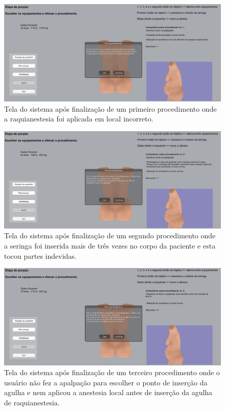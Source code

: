 \begin{figure}[ht!]
    \centering
    \includegraphics[width=\textwidth]{capitulos/figuras/sistema-exemplo-execucao-procedimento-1.png} 
    \caption{Tela do sistema após finalização de um primeiro procedimento onde a raquianestesia foi aplicada em local incorreto.}
    \label{fig:sistemaExecucao1RaquiLocalIncorreto}
\end{figure}

\begin{figure}[ht!]
    \centering
    \includegraphics[width=\textwidth]{capitulos/figuras/sistema-exemplo-execucao-procedimento-2.png} 
    \caption{Tela do sistema após finalização de um segundo procedimento onde a seringa foi inserida mais de três vezes no corpo da paciente e esta tocou partes indevidas.}
    \label{fig:sistemaExecucao2seringaCorreto}
\end{figure}

\begin{figure}[ht!]
    \centering
    \includegraphics[width=\textwidth]{capitulos/figuras/sistema-exemplo-execucao-procedimento-3.png} 
    \caption{Tela do sistema após finalização de um terceiro procedimento onde o usuário não fez a apalpação para escolher o ponto de inserção da agulha e nem aplicou a anestesia local antes de inserção da agulha de raquianestesia.}
    \label{fig:sistemaExecucao3faltouApalpacaoAnestesiaLocalIncorreto}
\end{figure}

